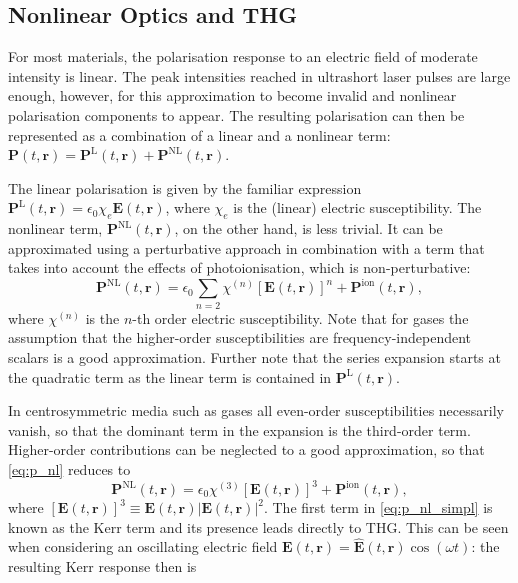 \documentclass[a4paper]{jpconf}
\begin{document}
\subsection{Nonlinear Optics and THG}
For most materials, the polarisation response to an electric field of moderate intensity is linear. The peak intensities reached in ultrashort laser pulses are large enough, however, for this approximation to become invalid and nonlinear polarisation components to appear. The resulting polarisation can then be represented as a combination of a linear and a nonlinear term: $\mathbf{P}(t, \mathbf{r}) = \mathbf{P}^\text{L}(t, \mathbf{r}) + \mathbf{P}^\text{NL}(t, \mathbf{r})$. \par 
The linear polarisation is given by the familiar expression $\mathbf{P}^\text{L}(t, \mathbf{r}) = \epsilon_0 \chi_e \mathbf{E}(t, \mathbf{r})$, where $\chi_e$ is the (linear) electric susceptibility. The nonlinear term, $\mathbf{P}^\text{NL}(t, \mathbf{r})$, on the other hand, is less trivial. It can be approximated using a perturbative approach in combination with a term that takes into account the effects of photoionisation, which is non-perturbative:
\begin{equation}\label{eq:p_nl}
\mathbf{P}^\text{NL}(t, \mathbf{r}) = \epsilon_0 \sum_{n=2} \chi^{(n)} [\mathbf{E}(t, \mathbf{r})]^n + \mathbf{P}^\text{ion}(t, \mathbf{r}),
\end{equation}
where $\chi^{(n)}$ is the $n$-th order electric susceptibility. Note that for gases the assumption that the higher-order susceptibilities are frequency-independent scalars is a good approximation. Further note that the series expansion starts at the quadratic term as the linear term is contained in $\mathbf{P}^\text{L}(t, \mathbf{r})$.  \par 
In centrosymmetric media such as gases all even-order susceptibilities necessarily vanish, so that the dominant term in the expansion is the third-order term. Higher-order contributions can be neglected to a good approximation, so that \eqref{eq:p_nl} reduces to
\begin{equation}\label{eq:p_nl_simpl}
\mathbf{P}^\text{NL}(t, \mathbf{r}) = \epsilon_0 \chi^{(3)} [\mathbf{E}(t, \mathbf{r})]^3 + \mathbf{P}^\text{ion}(t, \mathbf{r}),
\end{equation}
where $[\mathbf{E}(t, \mathbf{r})]^3 \equiv \mathbf{E}(t, \mathbf{r}) |\mathbf{E}(t, \mathbf{r})|^2$. 
The first term in \eqref{eq:p_nl_simpl} is known as the Kerr term and its presence leads directly to THG. This can be seen when considering an oscillating electric field $\mathbf{E}(t, \mathbf{r}) = \hat{\mathbf{E}}(t, \mathbf{r})\cos(\omega t)$: the resulting Kerr response then is 
\end{document}
